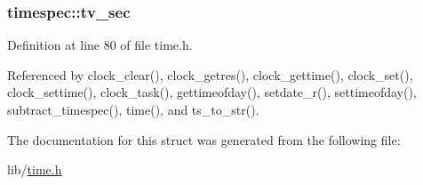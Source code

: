 \subsubsection[{\texorpdfstring{tv\+\_\+sec}{tv_sec}}]{ timespec\+::tv\+\_\+sec}\hypertarget{structtimespec_afc3302668d7cb5952f590da69fdd4955}{}\label{structtimespec_afc3302668d7cb5952f590da69fdd4955}


Definition at line 80 of file time.\+h.



Referenced by clock\+\_\+clear(), clock\+\_\+getres(), clock\+\_\+gettime(), clock\+\_\+set(), clock\+\_\+settime(), clock\+\_\+task(), gettimeofday(), setdate\+\_\+r(), settimeofday(), subtract\+\_\+timespec(), time(), and ts\+\_\+to\+\_\+str().



The documentation for this struct was generated from the following file\+:\begin{DoxyCompactItemize}
\item 
lib/\hyperlink{time_8h}{time.\+h}\end{DoxyCompactItemize}
